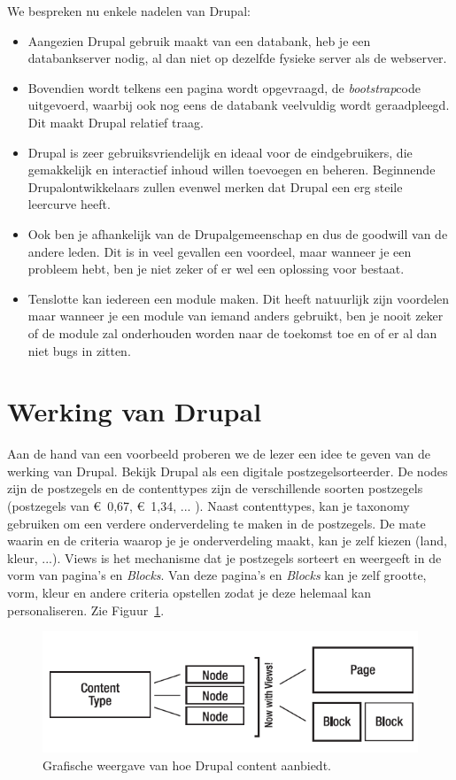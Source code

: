 We bespreken nu enkele nadelen van Drupal:
\begin{itemize}
\item Aangezien Drupal gebruik maakt van een databank, heb je een databankserver nodig, al dan niet op dezelfde fysieke server als de webserver.
\item Bovendien wordt telkens een pagina wordt opgevraagd, de \textit{bootstrap}code uitgevoerd, waarbij ook nog eens de databank veelvuldig wordt geraadpleegd. 
Dit maakt Drupal relatief traag.
\item Drupal is zeer gebruiksvriendelijk en ideaal voor de eindgebruikers, die gemakkelijk en interactief inhoud willen toevoegen en beheren. 
Beginnende Drupalontwikkelaars zullen evenwel merken dat Drupal een erg steile leercurve heeft.
\item Ook ben je afhankelijk van de Drupalgemeenschap en dus de goodwill van de andere leden. Dit is in veel gevallen een voordeel, maar wanneer je een probleem hebt, ben je niet zeker of er wel een oplossing voor bestaat.
\item Tenslotte kan iedereen een module maken. Dit heeft natuurlijk zijn voordelen maar wanneer je een module van iemand anders gebruikt, ben je nooit zeker of de module zal onderhouden worden naar de toekomst toe en of er al dan niet bugs in zitten.
\end{itemize}

\section{Werking van Drupal}

Aan de hand van een voorbeeld \cite{drupalDefGuide} proberen we de lezer een idee te geven van de werking van Drupal. Bekijk Drupal als een digitale postzegelsorteerder. De nodes zijn de postzegels en de contenttypes zijn de verschillende soorten postzegels (postzegels van \euro~0,67, \euro~1,34, ... ). Naast contenttypes, kan je taxonomy gebruiken om een verdere onderverdeling te maken in de postzegels. De mate waarin en de criteria waarop je je onderverdeling maakt, kan je zelf kiezen (land, kleur, ...). Views is het mechanisme dat je postzegels sorteert en weergeeft in de vorm van pagina's en \textit{Blocks}. Van deze pagina's en \textit{Blocks} kan je zelf grootte, vorm, kleur en andere criteria opstellen zodat je deze helemaal kan personaliseren. Zie Figuur~\ref{fig:drupalGrafischeWeergave}.

\begin{figure}[h]
\centering
\includegraphics{fig/drupalGrafischeWeergave}
\centering
\vspace{-10pt}
\caption{Grafische weergave van hoe Drupal content aanbiedt.}
\vspace{-10pt}
\label{fig:drupalGrafischeWeergave}
\end{figure}

